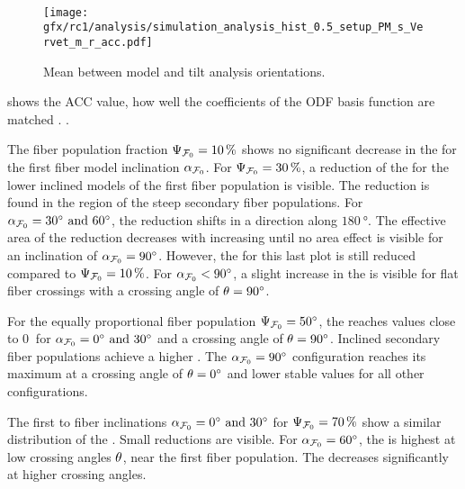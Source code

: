 \paragraph{\accvalue}
%
\begin{figure}[!p]
\centering
\texttt{[image: gfx/rc1/analysis/simulation\_analysis\_hist\_0.5\_setup\_PM\_s\_Vervet\_m\_r\_acc.pdf]}
\caption{Mean \accvalue{} between model and tilt analysis orientations. }
\label{fig:sim_ana_acc}
\end{figure}
% 
 shows the  \ac{ACC} value, \ie{} how well the coefficients of the \ac{ODF} basis function are matched \cite{Schilling2018}.
.
\par
% 
The fiber population fraction $\textnormal{$\Psi_{\textnormal{$\mathcal{F}_0$}}$}=\SI{10}{\percent}$ shows no significant decrease in the \accvalue{} for the first fiber model inclination $\textnormal{$\alpha_{\textnormal{$\mathcal{F}_0$}}$}$.
For $\textnormal{$\Psi_{\textnormal{$\mathcal{F}_0$}}$}=\SI{30}{\percent}$, a reduction of the \accvalue{} for the lower inclined models of the first fiber population is visible.
The reduction is found in the region of the steep secondary fiber populations.
For $\modelInc = \SIlist{30;60}{\degree}$, the reduction shifts in a direction along $\SI{180}{\degree}$.
The effective area of the reduction decreases with increasing \modelInc{} until no area effect is visible for an inclination of $\textnormal{$\alpha_{\textnormal{$\mathcal{F}_0$}}$}=\SI{90}{\degree}$.
However, the \accvalue{} for this last plot is still reduced compared to $\textnormal{$\Psi_{\textnormal{$\mathcal{F}_0$}}$}=\SI{10}{\percent}$.
For $\textnormal{$\alpha_{\textnormal{$\mathcal{F}_0$}}$} < \SI{90}{\degree}$, a slight increase in the \accvalue{} is visible for flat fiber crossings with a crossing angle of $\textnormal{$\theta$}=\SI{90}{\degree}$.
\par
%
For the equally proportional fiber population $\textnormal{$\Psi_{\textnormal{$\mathcal{F}_0$}}$} = \SI{50}{\degree}$, the \accvalue{} reaches values close to $\SI{0}{}$ for $\modelInc = \SIlist{0;30}{\degree}$ and a crossing angle of $\textnormal{$\theta$}=\SI{90}{\degree}$.
Inclined secondary fiber populations achieve a higher \accvalue{}.
The $\textnormal{$\alpha_{\textnormal{$\mathcal{F}_0$}}$} = \SI{90}{\degree}$ configuration reaches its maximum \accvalue{} at a crossing angle of $\textnormal{$\theta$}=\SI{0}{\degree}$ and lower stable values for all other configurations.
\par
%
The first to fiber inclinations $\modelInc = \SIlist{0;30}{\degree}$ for $\textnormal{$\Psi_{\textnormal{$\mathcal{F}_0$}}$}=\SI{70}{\percent}$ show a similar distribution of the \accvalue{}. 
Small reductions are visible.
For $\textnormal{$\alpha_{\textnormal{$\mathcal{F}_0$}}$}=\SI{60}{\degree}$, the \accvalue{} is highest at low crossing angles $\textnormal{$\theta$}$, \ie{} near the first fiber population.
The \accvalue{} decreases significantly at higher crossing angles.

